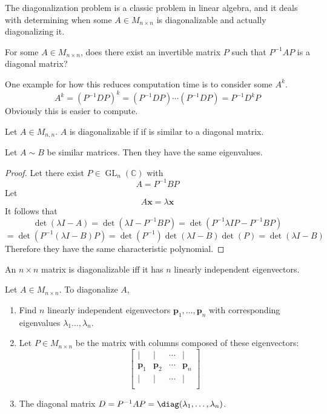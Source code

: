 The diagonalization problem is a classic problem in linear algebra, and it deals with determining when some \(A\in M_{n\times n}\) is diagonalizable and actually diagonalizing it.
\begin{problem}
    For some \(A\in M_{n\times n}\), does there exist an invertible matrix \(P\) such that \(P ^{-1} AP\) is a diagonal matrix?
\end{problem}
One example for how this reduces computation time is to consider some \(A^k\).
\[
    A^k = \left( P ^{-1} DP \right)^k = \left( P ^{-1} DP \right)\cdots\left( P ^{-1} DP \right)= P ^{-1} D^k P
\]
Obviously this is easier to compute.
\begin{definition}
    Let \(A\in M_{n,n}\). \(A\) is diagonalizable if if is similar to a diagonal matrix.
\end{definition}
\begin{theorem}
    Let \(A\sim B\) be similar matrices. Then they have the same eigenvalues.
\end{theorem}
\begin{proof}
    Let there exist \(P\in \operatorname{GL}_n(\mathbb{C} ) \) with
    \[
        A = P ^{-1} BP
    \]
    Let
    \[
        A \mathbf{x} =\lambda \mathbf{x} 
    \]
    It follows that
    \[
        \det (\lambda I - A)=\det \left(\lambda I - P ^{-1} BP\right)=\det \left( P ^{-1} \lambda IP - P ^{-1} BP \right)
    \]
    \[
        =\det \left( P ^{-1} (\lambda I - B)P \right) =\det (P ^{-1} )\det (\lambda I - B)\det (P) = \det (\lambda I-B)
    \]
    Therefore they have the same characteristic polynomial.
\end{proof}
\begin{theorem}
    An \(n\times n\) matrix is diagonalizable iff it has \(n\) linearly independent eigenvectors.
\end{theorem}
\begin{theorem}
    Let \(A\in M_{n\times n}\). To diagonalize \(A\),
    \begin{enumerate}
        \item Find \(n\) linearly independent eigenvectors \(\mathbf{p}_1,\ldots,\mathbf{p} _n\) with corresponding eigenvalues \(\lambda _1\ldots,\lambda _n\).
        \item Let \(P\in M_{n\times n}\) be the matrix with columns composed of these eigenvectors:
        \[
            \begin{bmatrix}
                \mid  & \mid  &\cdots  & \mid    \\
                 \mathbf{p} _1&\mathbf{p} _2  &\cdots  &\mathbf{p} _n   \\
                \mid  & \mid  & \cdots  & \mid   \\
            \end{bmatrix}
        \]
        \item The diagonal matrix \(D=P ^{-1} AP=\diag (\lambda _1,\ldots,\lambda _n)\).
    \end{enumerate}
\end{theorem}
